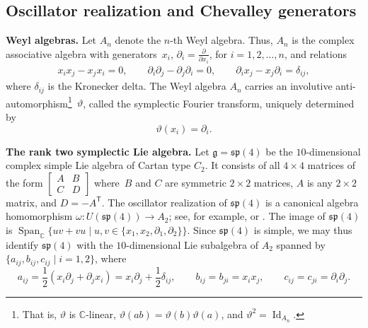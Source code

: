 \documentclass[pdftex]{sigma}
\numberwithin{equation}{section}
\DeclareMathOperator{\Id}{Id}
\DeclareMathOperator{\Span}{Span}
\begin{document}
\subsection{Oscillator realization and Chevalley generators}\label{subsec:Oscillator-Chevalley}

{\bf Weyl algebras.}
Let $A_{n}$ denote the $n$-th Weyl algebra. Thus, $A_{n}$ is the complex associative algebra with generators~$x_{i}$, $\partial_{i} = \frac{\partial}{\partial x_{i}}$, for $i=1,2,\dots,n$, and relations
\begin{align}\label{eq:weylrels}
	x_ix_j-x_ jx_i =0,\qquad
	\partial_i\partial_j-\partial_j\partial_i =0,\qquad
	\partial_ix_j-x_j\partial_i =\delta_{ij},
\end{align}
where $\delta_{ij}$ is the Kronecker delta. The Weyl algebra $A_{n}$ carries an involutive anti-automor\-phism\footnote{That is, $\vartheta$ is $\mathbb{C}$-linear, $\vartheta(ab)=\vartheta(b)\vartheta(a)$, and $\vartheta^2=\Id_{A_n}$.}~$\vartheta$, called the symplectic Fourier transform, uniquely determined by
\begin{equation}\label{eq:vartheta}
	\vartheta(x_{i})=\partial_{i}.
\end{equation}

{\bf The rank two symplectic Lie algebra.}
Let $\mathfrak{g}=\mathfrak{sp}(4)$ be the $10$-dimensional complex simple Lie algebra of Cartan type $C_2$. It consists of all $4\times 4$ matrices of the form $\left[\begin{smallmatrix}A&B\\C&D\end{smallmatrix}\right]$ where~$B$ and $C$ are symmetric $2\times 2$ matrices, $A$ is any $2\times 2$ matrix, and $D=-A^{\mathsf{T}}$.
The oscillator realization of $\mathfrak{sp}(4)$ is a canonical algebra homomorphism $\omega\colon U(\mathfrak{sp}(4))\to A_2$; see, for example, \cite[Section~4.6]{dixmierEnvelopingAlgebras1996} or \cite{havlicekCanonicalRealizationsLie1976}.
The image of $\mathfrak{sp}(4)$ is $\Span_\mathbb{C}\{uv+vu\mid u,v\in\{x_1,x_2,\partial_1,\partial_2\}\}$.
Since $\mathfrak{sp}(4)$ is simple, we may thus identify $\mathfrak{sp}(4)$ with the $10$-dimensional Lie subalgebra of $A_{2}$ spanned by $\{a_{ij}, b_{ij}, c_{ij} \mid i = 1,2\}$, where
\begin{equation}\label{eq:sp4-oscillator}
	a_{ij} = \frac{1}{2}(x_i\partial_j+\partial_jx_i)=x_i\partial_j+\frac{1}{2}\delta_{ij},\qquad
	b_{ij} = b_{ji} = x_ix_j,\qquad
	c_{ij} = c_{ji} = \partial_i\partial_j.
\end{equation}
\end{document}
